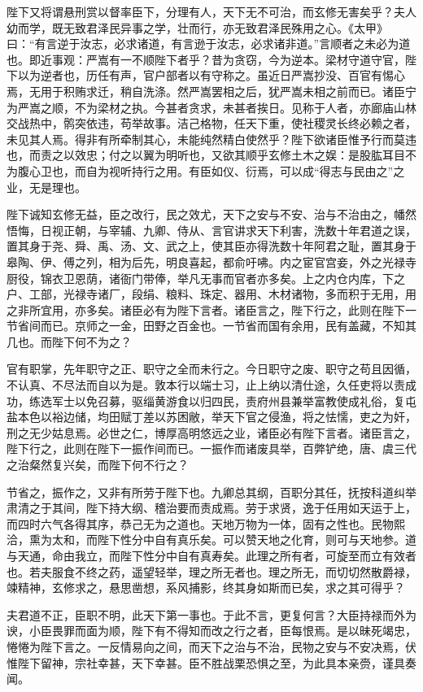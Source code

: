 \documentclass[UTF8,titlepage,oneside]{ctexbook}
\begin{document}
陛下又将谓悬刑赏以督率臣下，分理有人，天下无不可治，而玄修无害矣乎？夫人幼而学，既无致君泽民异事之学，壮而行，亦无致君泽民殊用之心。《太甲》曰：“有言逆于汝志，必求诸道，有言逊于汝志，必求诸非道。”言顺者之未必为道也。即近事观：严嵩有一不顺陛下者乎？昔为贪窃，今为逆本。梁材守道守官，陛下以为逆者也，历任有声，官户部者以有守称之。虽近日严嵩抄没、百官有惕心焉，无用于积贿求迁，稍自洗涤。然严嵩罢相之后，犹严嵩未相之前而已。诸臣宁为严嵩之顺，不为梁材之执。今甚者贪求，未甚者挨日。见称于人者，亦廊庙山林交战热中，鹘突依违，苟举故事。洁己格物，任天下重，使社稷灵长终必赖之者，未见其人焉。得非有所牵制其心，未能纯然精白使然乎？陛下欲诸臣惟予行而莫违也，而责之以效忠；付之以翼为明听也，又欲其顺乎玄修土木之娱：是股肱耳目不为腹心卫也，而自为视听持行之用。有臣如仪、衍焉，可以成“得志与民由之”之业，无是理也。

陛下诚知玄修无益，臣之改行，民之效尤，天下之安与不安、治与不治由之，幡然悟悔，日视正朝，与宰辅、九卿、侍从、言官讲求天下利害，洗数十年君道之误，置其身于尧、舜、禹、汤、文、武之上，使其臣亦得洗数十年阿君之耻，置其身于皋陶、伊、傅之列，相为后先，明良喜起，都俞吁咈。内之宦官宫妾，外之光禄寺厨役，锦衣卫恩荫，诸衙门带俸，举凡无事而官者亦多矣。上之内仓内库，下之户、工部，光禄寺诸厂，段绢、粮料、珠定、器用、木材诸物，多而积于无用，用之非所宜用，亦多矣。诸臣必有为陛下言者。诸臣言之，陛下行之，此则在陛下一节省间而已。京师之一金，田野之百金也。一节省而国有余用，民有盖藏，不知其几也。而陛下何不为之？

官有职掌，先年职守之正、职守之全而未行之。今日职守之废、职守之苟且因循，不认真、不尽法而自以为是。敦本行以端士习，止上纳以清仕途，久任吏将以责成功，练选军士以免召募，驱缁黄游食以归四民，责府州县兼举富教使成礼俗，复屯盐本色以裕边储，均田赋丁差以苏困敝，举天下官之侵渔，将之怯懦，吏之为奸，刑之无少姑息焉。必世之仁，博厚高明悠远之业，诸臣必有陛下言者。诸臣言之，陛下行之，此则在陛下一振作间而已。一振作而诸废具举，百弊铲绝，唐、虞三代之治粲然复兴矣，而陛下何不行之？

节省之，振作之，又非有所劳于陛下也。九卿总其纲，百职分其任，抚按科道纠举肃清之于其间，陛下持大纲、稽治要而责成焉。劳于求贤，逸于任用如天运于上，而四时六气各得其序，恭己无为之道也。天地万物为一体，固有之性也。民物熙洽，熏为太和，而陛下性分中自有真乐矣。可以赞天地之化育，则可与天地参。道与天通，命由我立，而陛下性分中自有真寿矣。此理之所有者，可旋至而立有效者也。若夫服食不终之药，遥望轻举，理之所无者也。理之所无，而切切然散爵禄，竦精神，玄修求之，悬思凿想，系风捕影，终其身如斯而已矣，求之其可得乎？

夫君道不正，臣职不明，此天下第一事也。于此不言，更复何言？大臣持禄而外为谀，小臣畏罪而面为顺，陛下有不得知而改之行之者，臣每恨焉。是以昧死竭忠，惓惓为陛下言之。一反情易向之间，而天下之治与不治，民物之安与不安决焉，伏惟陛下留神，宗社幸甚，天下幸甚。臣不胜战栗恐惧之至，为此具本亲赍，谨具奏闻。
\end{document}
